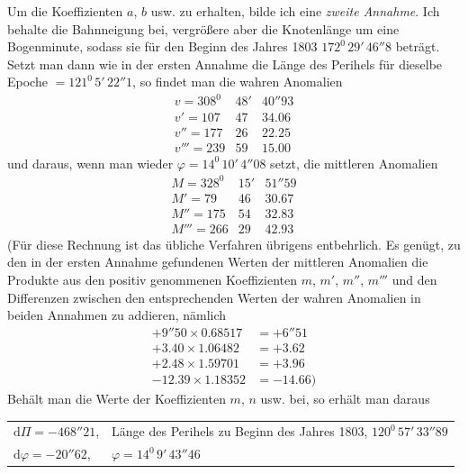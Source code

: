 Um die Koeffizienten $a$, $b$ usw. zu erhalten, bilde ich eine \textit{zweite Annahme}. Ich behalte die Bahnneigung bei, vergrößere aber die Knotenlänge um eine Bogenminute, sodass sie für den Beginn des Jahres 1803 $172^0\,29'\,46''8$ beträgt. Setzt man dann wie in der ersten Annahme die Länge des Perihels für dieselbe Epoche $=121^0\,5'\,22''1$, so findet man die wahren Anomalien
\[
\begin{array}{rrr}
v=308^0&48'&40''93\\
v'=107&47&34.06\\
v''=177&26&22.25\\
v'''=239&59&15.00
\end{array}
\]
und daraus, wenn man wieder $\varphi=14^0\,10'\,4''08$ setzt, die mittleren Anomalien
\[
\begin{array}{rrr}
M=328^0&15'&51''59\\
M'=79&46&30.67\\
M''=175&54&32.83\\
M'''=266&29&42.93
\end{array}
\]
(Für diese Rechnung ist das übliche Verfahren übrigens entbehrlich. Es genügt, zu den in der ersten Annahme gefundenen Werten der mittleren Anomalien die Produkte aus den positiv genommenen Koeffizienten $m$, $m'$, $m''$, $m'''$ und den Differenzen zwischen den entsprechenden Werten der wahren Anomalien in beiden Annahmen zu addieren, nämlich
\[
\begin{aligned}
+9''50\times0.68517&=+6''51\\
+3.40\times1.06482&=+3.62\\
+2.48\times1.59701&=+3.96\\
-12.39\times1.18352&=-14.66)
\end{aligned}
\]
Behält man die Werte der Koeffizienten $m$, $n$ usw. bei, so erhält man daraus
\par\nobreak\smallskip
\noindent\hspace*{.06\linewidth}%
{\fontsize{9}{11}\selectfont\begin{tabular}[t]{@{}p{.20\linewidth}@{\enspace}p{.70\linewidth}@{}}
$\mathrm d\Pi=-468''21$,&Länge des Perihels zu Beginn des Jahres 1803, $120^0\,57'\,33''89$\\
$\mathrm d\varphi=-20''62$,&\hspace*{.30\linewidth}$\varphi=14^0\,9'\,43''46$
\end{tabular}}\par\nobreak\smallskip
\par\nobreak\smallskip
\noindent\hspace*{.06\linewidth}%
